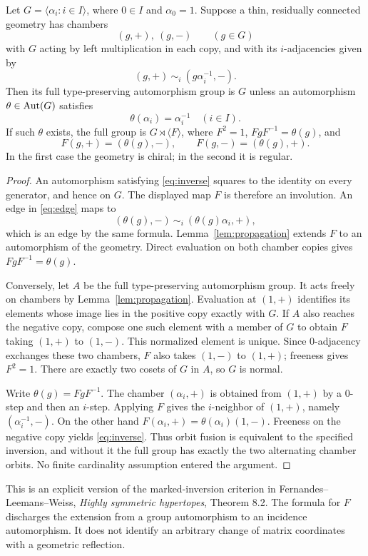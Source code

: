 \begin{theorem}\label{thm:reflection}
Let $G=\langle\alpha_i:i\in I\rangle$, where $0\in I$ and $\alpha_0=1$. Suppose a thin, residually connected geometry has chambers
\[
             (g,+),\ (g,-)\qquad(g\in G)
\]
with $G$ acting by left multiplication in each copy, and with its $i$-adjacencies given by
\begin{equation}\label{eq:edge}
                   (g,+)\ \sim_i\ (g\alpha_i^{-1},-).
\end{equation}
Then its full type-preserving automorphism group is $G$ unless an automorphism $\theta\in\operatorname{Aut}(G)$ satisfies
\begin{equation}\label{eq:inverse}
                       \theta(\alpha_i)=\alpha_i^{-1}
                       \quad(i\in I).
\end{equation}
If such $\theta$ exists, the full group is $G\rtimes\langle F\rangle$, where $F^2=1$, $FgF^{-1}=\theta(g)$, and
\[
 F(g,+)=(\theta(g),-),\qquad F(g,-)=(\theta(g),+).
\]
In the first case the geometry is chiral; in the second it is regular.
\end{theorem}
\begin{proof}
An automorphism satisfying \eqref{eq:inverse} squares to the identity on every generator, and hence on $G$. The displayed map $F$ is therefore an involution. An edge in \eqref{eq:edge} maps to
\[
        (\theta(g),-)\ \sim_i\ (\theta(g)\alpha_i,+),
\]
which is an edge by the same formula. Lemma~\ref{lem:propagation} extends $F$ to an automorphism of the geometry. Direct evaluation on both chamber copies gives $FgF^{-1}=\theta(g)$.

Conversely, let $A$ be the full type-preserving automorphism group. It acts freely on chambers by Lemma~\ref{lem:propagation}. Evaluation at $(1,+)$ identifies its elements whose image lies in the positive copy exactly with $G$. If $A$ also reaches the negative copy, compose one such element with a member of $G$ to obtain $F$ taking $(1,+)$ to $(1,-)$. This normalized element is unique. Since $0$-adjacency exchanges these two chambers, $F$ also takes $(1,-)$ to $(1,+)$; freeness gives $F^2=1$. There are exactly two cosets of $G$ in $A$, so $G$ is normal.

Write $\theta(g)=FgF^{-1}$. The chamber $(\alpha_i,+)$ is obtained from $(1,+)$ by a $0$-step and then an $i$-step. Applying $F$ gives the $i$-neighbor of $(1,+)$, namely $(\alpha_i^{-1},-)$. On the other hand $F(\alpha_i,+)=\theta(\alpha_i)(1,-)$. Freeness on the negative copy yields \eqref{eq:inverse}. Thus orbit fusion is equivalent to the specified inversion, and without it the full group has exactly the two alternating chamber orbits. No finite cardinality assumption entered the argument.
\end{proof}

This is an explicit version of the marked-inversion criterion in Fernandes--Leemans--Weiss, \emph{Highly symmetric hypertopes}, Theorem 8.2. The formula for $F$ discharges the extension from a group automorphism to an incidence automorphism. It does not identify an arbitrary change of matrix coordinates with a geometric reflection.
